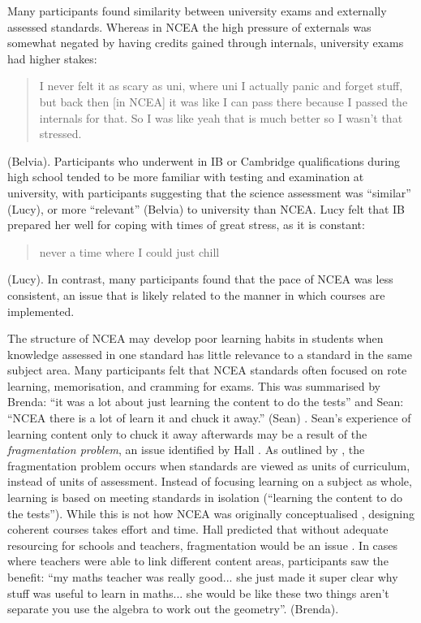 \documentclass[a4paper,man,natbib]{apa6}
\begin{document}
Many participants found similarity between university exams and externally assessed standards. Whereas in NCEA the high pressure of externals was somewhat negated by having credits gained through internals, university exams had higher stakes: \blockquote{I never felt it as scary as uni, where uni I actually panic and forget stuff, but back then [in NCEA] it was like I can pass there because I passed the internals for that. So I was like yeah that is much better so I wasn't that stressed.} (Belvia). Participants who underwent in IB or Cambridge qualifications during high school tended to be more familiar with testing and examination at university, with participants suggesting that the science assessment was ``similar'' (Lucy), or more ``relevant'' (Belvia) to university than NCEA. Lucy felt that IB prepared her well for coping with times of great stress, as it is constant: \blockquote{never a time where I could just chill 
} (Lucy). In contrast, many participants found that the pace of NCEA was less consistent, an issue that is likely related to the manner in which courses are implemented. 

The structure of NCEA may develop poor learning habits in students when knowledge assessed in one standard has little relevance to a standard in the same subject area. Many participants felt that NCEA standards often focused on rote learning, memorisation, and cramming for exams. This was summarised by Brenda: ``it was a lot about just learning the content to do the tests'' and Sean: ``NCEA there is a lot of learn it and chuck it away.'' (Sean) . Sean's experience of learning content only to chuck it away afterwards may be a result of the \textit{fragmentation problem}, an issue identified by Hall \cite{hall2000national}. As outlined by \cite{hipkins}, the fragmentation problem occurs when standards are viewed as units of curriculum, instead of units of assessment. Instead of focusing learning on a subject as whole, learning is based on meeting standards in isolation (``learning the content to do the tests''). While this is not how NCEA was originally conceptualised \cite{hipkins}, designing coherent courses takes effort and time. Hall predicted that without adequate resourcing for schools and teachers, fragmentation would be an issue \cite{hall2000national}. In cases where teachers were able to link different content areas, participants saw the benefit: ``my maths teacher was really good... she just made it super clear why stuff was useful to learn in maths... she would be like these two things aren't separate you use the algebra to work out the geometry''. (Brenda).
 
\end{document}
